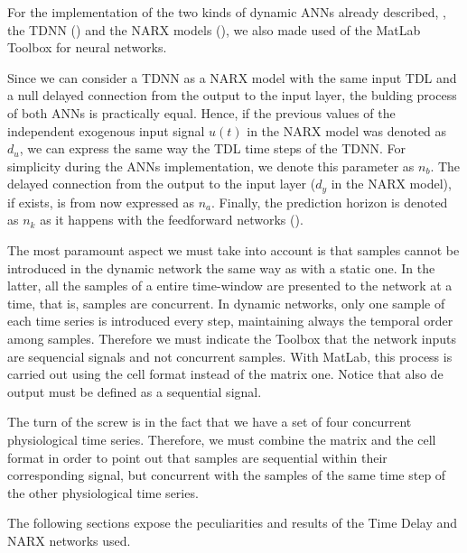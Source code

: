 
\label{sec:application:tdnn}

For the implementation of the two kinds of dynamic ANNs already
described,
\ie, the TDNN () and the NARX models (), 
we also made used of the MatLab Toolbox for neural networks. 

Since we can consider a TDNN as a NARX model with the same input TDL
and a null delayed connection from the output to the input layer, the
bulding process of both ANNs is practically equal. Hence, if the
previous values of the independent exogenous input signal $u(t)$ in
the NARX model was denoted as $d_{u}$, we can express the same way the
TDL time steps of the TDNN. For simplicity during the ANNs
implementation, we denote this parameter as $n_{b}$. The delayed
connection from the output to the input layer ($d_{y}$ in the NARX
model), if exists, is from now expressed as $n_{a}$.  Finally, the
prediction horizon is denoted as $n_{k}$ as it happens with the
feedforward networks ().

The most paramount aspect we must take into account is that samples
cannot be introduced in the dynamic network the same way as with a
static one.  In the latter, all the samples of a entire time-window
are presented to the network at a time, that is, samples are
concurrent.  In dynamic networks, only one sample of each time series
is introduced every step, maintaining always the temporal order among
samples. Therefore we must indicate the Toolbox that the network
inputs are sequencial signals and not concurrent samples. With MatLab,
this process is carried out using the cell format instead of the
matrix one. Notice that also de output must be defined as a sequential
signal.

The turn of the screw is in the fact that we have a set of four
concurrent physiological time series. Therefore, we must combine the
matrix and the cell format in order to point out that samples are
sequential within their corresponding signal, but concurrent with the
samples of the same time step of the other physiological time series.

The following sections expose the peculiarities and results of the
Time Delay and NARX networks used.



